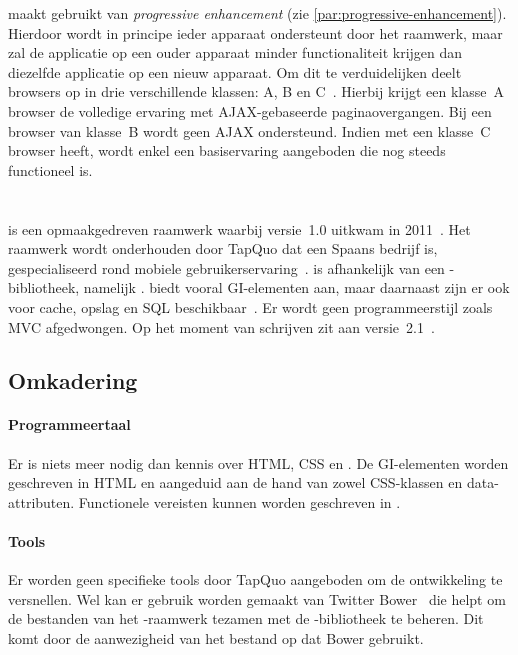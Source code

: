 \jqm{} maakt gebruikt van \emph{progressive enhancement} (zie \ref{par:progressive-enhancement}).
Hierdoor wordt in principe ieder apparaat ondersteunt door het raamwerk, maar zal de applicatie op een ouder apparaat minder functionaliteit krijgen dan diezelfde applicatie op een nieuw apparaat.
Om dit te verduidelijken deelt \jqm{} browsers op in drie verschillende klassen: A, B en C~\cite{JQuery2012d}. 
Hierbij krijgt een klasse~A browser de volledige ervaring met AJAX-gebaseerde paginaovergangen.
Bij een browser van klasse~B wordt geen AJAX ondersteund.
Indien met een klasse~C browser heeft, wordt enkel een basiservaring aangeboden die nog steeds functioneel is.


\section{\lungo}
\label{sec:raamwerk-lungo}
\lungo{} is een opmaakgedreven raamwerk waarbij versie~1.0 uitkwam in 2011~\cite{TapQuo2011}.
Het raamwerk wordt onderhouden door TapQuo dat een Spaans bedrijf is, gespecialiseerd rond mobiele gebruikerservaring~\cite{TapQuo2013a}.
\lungo{} is afhankelijk van een \js{}-bibliotheek, namelijk \quo{}.
\lungo{} biedt vooral GI-elementen aan, maar daarnaast zijn er ook  voor cache, opslag en SQL beschikbaar~\cite{TapQuo2013}.
Er wordt geen programmeerstijl zoals MVC afgedwongen.
Op het moment van schrijven zit \lungo{} aan versie~2.1~\cite{TapQuo2013}.

\subsection{Omkadering}
\paragraph{Programmeertaal}
Er is niets meer nodig dan kennis over HTML, CSS en \js{}.
De GI-elementen worden geschreven in HTML en aangeduid aan de hand van zowel CSS-klassen en data-attributen.
Functionele vereisten kunnen worden geschreven in \js{}.

\paragraph{Tools}
Er worden geen specifieke tools door TapQuo aangeboden om de ontwikkeling te versnellen.
Wel kan er gebruik worden gemaakt van Twitter Bower~\cite{Twitter2013} die helpt om de bestanden van het \lungo{}-raamwerk tezamen met de \quo{}-bibliotheek te beheren.
Dit komt door de aanwezigheid van het bestand  op \gh{} dat Bower gebruikt.

